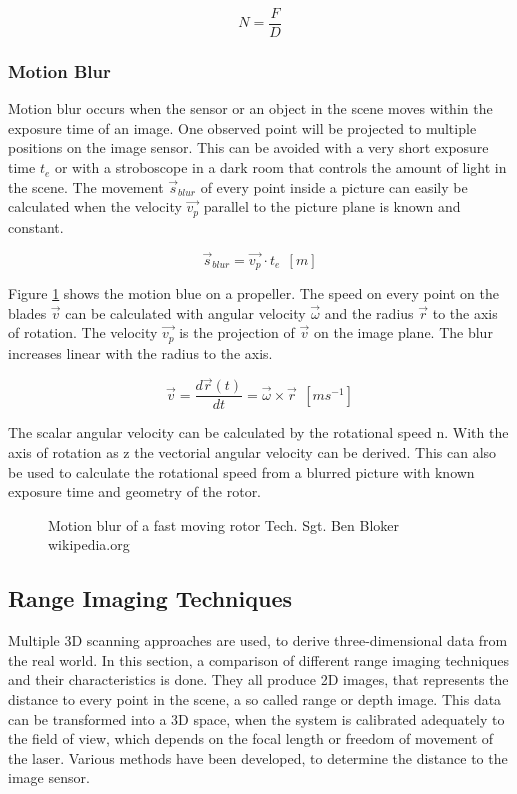 \begin{equation}
N=\frac{F}{D}
\end{equation}

\subsubsection{Motion Blur}
Motion blur occurs when the sensor or an object in the scene moves within the exposure time of an image. One observed point will be projected to multiple positions on the image sensor. This can be avoided with a very short exposure time $t_e$ or with a stroboscope in a dark room that controls the amount of light in the scene. The movement $\vec{s}_{blur}$ of every point inside a picture can easily be calculated when the velocity $\vec{v_p}$ parallel to the picture plane is known and constant.

\begin{equation}
{\vec{s}_{blur}} = \vec{v_p}\cdot t_e ~~[m]
\label{eq:motion_blur}
\end{equation}

Figure \ref{fig:motionblur} shows the motion blue on a propeller. The speed on every point on the blades $\vec{v}$ can be calculated with angular velocity $\vec{\omega}$ and the radius $\vec{r}$ to the axis of rotation. The velocity $\vec{v_p}$ is the projection of $\vec{v}$ on the image plane. The blur increases linear with the radius to the axis.

\begin{equation}
\vec{v} = \frac{d\vec{r}(t)}{dt} = \vec{\omega}\times \vec{r}~~[ms^{-1}]
\end{equation}

The scalar angular velocity can be calculated by the rotational speed n. With the axis of rotation as z the vectorial angular velocity can be derived. This can also be used to calculate the rotational speed from a blurred picture with known exposure time and geometry of the rotor. 


\begin{figure} [!h]
	\centering
	\caption{Motion blur of a fast moving rotor \tiny Tech. Sgt. Ben Bloker wikipedia.org}
	\label{fig:motionblur}
\end{figure} 

\newpage

\subsection{Range Imaging Techniques}
Multiple 3D scanning approaches are used, to derive three-dimensional data from the real world. In this section, a comparison of different range imaging techniques and their characteristics is done. They all produce 2D images, that represents the distance to every point in the scene, a so called range or depth image. This data can be transformed into a 3D space, when the system is calibrated adequately to the field of view, which depends on the focal length or freedom of movement of the laser. Various methods have been developed, to determine the distance to the image sensor.


